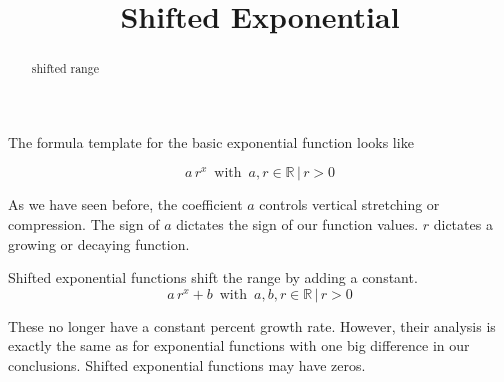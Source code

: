 \documentclass{ximera}
\title{Shifted Exponential}
\begin{document}
\begin{abstract}
shifted range
\end{abstract}
\maketitle




The formula template for the basic exponential function looks like




\[  a \, r^x   \, \text{ with } \,  a, r \in \mathbb{R} \, | \,  r > 0   \]


As we have seen before, the coefficient $a$ controls vertical stretching or compression. The sign of $a$ dictates the sign of our function values. $r$ dictates a growing or decaying function.


Shifted exponential functions shift the range by adding a constant. \\


\[  a \, r^x  + b \, \text{ with } \,  a, b, r \in \mathbb{R} \, | \,  r > 0   \]




These no longer have a constant percent growth rate.  However, their analysis is exactly the same as for exponential functions with one big difference in our conclusions. Shifted exponential functions may have zeros. \\
\end{document}
